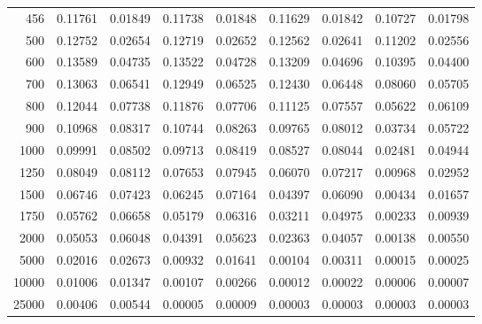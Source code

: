\begin{table}[ht]
\begin{tabular}{r|c|c|c|c|c|c|c|c}
      456 & 0.11761 & 0.01849 & 0.11738 & 0.01848 & 0.11629 & 0.01842 & 0.10727 & 0.01798 \\
      500 & 0.12752 & 0.02654 & 0.12719 & 0.02652 & 0.12562 & 0.02641 & 0.11202 & 0.02556 \\
      600 & 0.13589 & 0.04735 & 0.13522 & 0.04728 & 0.13209 & 0.04696 & 0.10395 & 0.04400 \\
      700 & 0.13063 & 0.06541 & 0.12949 & 0.06525 & 0.12430 & 0.06448 & 0.08060 & 0.05705 \\
      800 & 0.12044 & 0.07738 & 0.11876 & 0.07706 & 0.11125 & 0.07557 & 0.05622 & 0.06109 \\
      900 & 0.10968 & 0.08317 & 0.10744 & 0.08263 & 0.09765 & 0.08012 & 0.03734 & 0.05722 \\
     1000 & 0.09991 & 0.08502 & 0.09713 & 0.08419 & 0.08527 & 0.08044 & 0.02481 & 0.04944 \\
     1250 & 0.08049 & 0.08112 & 0.07653 & 0.07945 & 0.06070 & 0.07217 & 0.00968 & 0.02952 \\
     1500 & 0.06746 & 0.07423 & 0.06245 & 0.07164 & 0.04397 & 0.06090 & 0.00434 & 0.01657 \\
     1750 & 0.05762 & 0.06658 & 0.05179 & 0.06316 & 0.03211 & 0.04975 & 0.00233 & 0.00939 \\
     2000 & 0.05053 & 0.06048 & 0.04391 & 0.05623 & 0.02363 & 0.04057 & 0.00138 & 0.00550 \\
     5000 & 0.02016 & 0.02673 & 0.00932 & 0.01641 & 0.00104 & 0.00311 & 0.00015 & 0.00025 \\
    10000 & 0.01006 & 0.01347 & 0.00107 & 0.00266 & 0.00012 & 0.00022 & 0.00006 & 0.00007 \\
    25000 & 0.00406 & 0.00544 & 0.00005 & 0.00009 & 0.00003 & 0.00003 & 0.00003 & 0.00003 \\ \cline{1-9}
    \end{tabular}
    \label{tab:XRayEffODE1}
\end{table}
